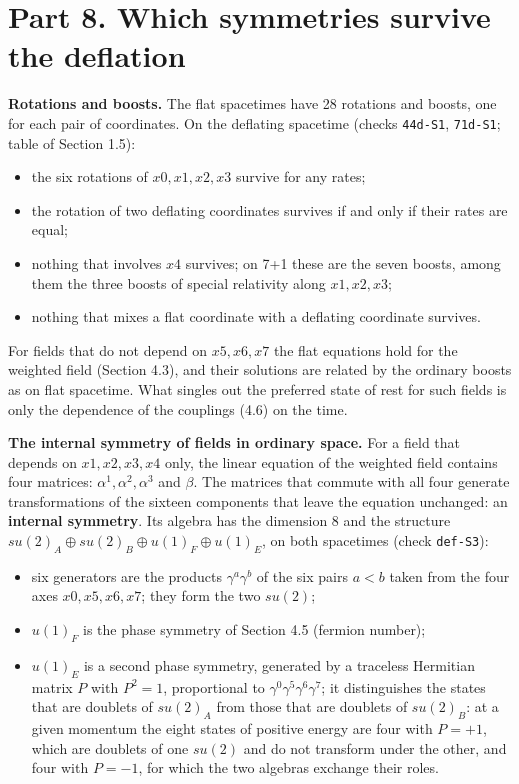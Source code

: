 \documentclass[
  10pt,
]{article}
\providecommand{\tightlist}{%
  \setlength{\itemsep}{0pt}\setlength{\parskip}{0pt}}
\begin{document}
\hypertarget{part-8.-which-symmetries-survive-the-deflation}{%
\section{Part 8. Which symmetries survive the
deflation}\label{part-8.-which-symmetries-survive-the-deflation}}

\textbf{Rotations and boosts.} The flat spacetimes have 28 rotations and
boosts, one for each pair of coordinates. On the deflating spacetime
(checks \texttt{44d-S1}, \texttt{71d-S1}; table of Section 1.5):

\begin{itemize}
\tightlist
\item
  the six rotations of \(x0,x1,x2,x3\) survive for any rates;
\item
  the rotation of two deflating coordinates survives if and only if
  their rates are equal;
\item
  nothing that involves \(x4\) survives; on 7+1 these are the seven
  boosts, among them the three boosts of special relativity along
  \(x1,x2,x3\);
\item
  nothing that mixes a flat coordinate with a deflating coordinate
  survives.
\end{itemize}

For fields that do not depend on \(x5,x6,x7\) the flat equations hold
for the weighted field (Section 4.3), and their solutions are related by
the ordinary boosts as on flat spacetime. What singles out the preferred
state of rest for such fields is only the dependence of the couplings
(4.6) on the time.

\textbf{The internal symmetry of fields in ordinary space.} For a field
that depends on \(x1,x2,x3,x4\) only, the linear equation of the
weighted field contains four matrices: \(\alpha^1,\alpha^2,\alpha^3\)
and \(\beta\). The matrices that commute with all four generate
transformations of the sixteen components that leave the equation
unchanged: an \textbf{internal symmetry}. Its algebra has the dimension
8 and the structure \(su(2)_A\oplus su(2)_B\oplus u(1)_F\oplus u(1)_E\),
on both spacetimes (check \texttt{def-S3}):

\begin{itemize}
\tightlist
\item
  six generators are the products \(\gamma^a\gamma^b\) of the six pairs
  \(a<b\) taken from the four axes \(x0,x5,x6,x7\); they form the two
  \(su(2)\);
\item
  \(u(1)_F\) is the phase symmetry of Section 4.5 (fermion number);
\item
  \(u(1)_E\) is a second phase symmetry, generated by a traceless
  Hermitian matrix \(P\) with \(P^2=1\), proportional to
  \(\gamma^0\gamma^5\gamma^6\gamma^7\); it distinguishes the states that
  are doublets of \(su(2)_A\) from those that are doublets of
  \(su(2)_B\): at a given momentum the eight states of positive energy
  are four with \(P=+1\), which are doublets of one \(su(2)\) and do not
  transform under the other, and four with \(P=-1\), for which the two
  algebras exchange their roles.
\end{itemize}
\end{document}
